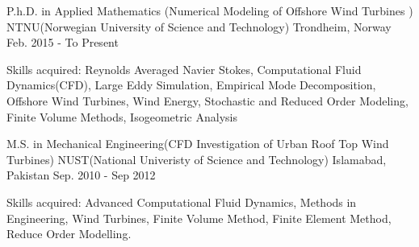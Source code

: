 

\begin{cventries}
	
	\cventry
	{P.h.D. in Applied Mathematics (Numerical Modeling of Offshore Wind Turbines )} %
	{NTNU(Norwegian University of Science and Technology)} %
	{Trondheim, Norway} %
	{Feb. 2015 - To Present} %
	{
		\begin{cvitems} %
			\item {Skills acquired: Reynolds Averaged Navier Stokes, Computational Fluid Dynamics(CFD), Large Eddy Simulation, Empirical Mode Decomposition, Offshore Wind Turbines, Wind Energy, Stochastic and Reduced Order Modeling, Finite Volume Methods, Isogeometric Analysis}
		\end{cvitems}
	}
	
\end{cventries}


\begin{cventries}

  \cventry
    {M.S. in Mechanical Engineering(CFD Investigation of Urban Roof Top Wind Turbines)} %
    {NUST(National Univeristy of Science and Technology)} %
    {Islamabad, Pakistan} %
    {Sep. 2010 - Sep 2012} %
    {
      \begin{cvitems} %
        \item {Skills acquired: Advanced Computational Fluid Dynamics, Methods in Engineering, Wind Turbines, Finite Volume Method, Finite Element Method, Reduce Order Modelling.}
      \end{cvitems}
    }

\end{cventries}

